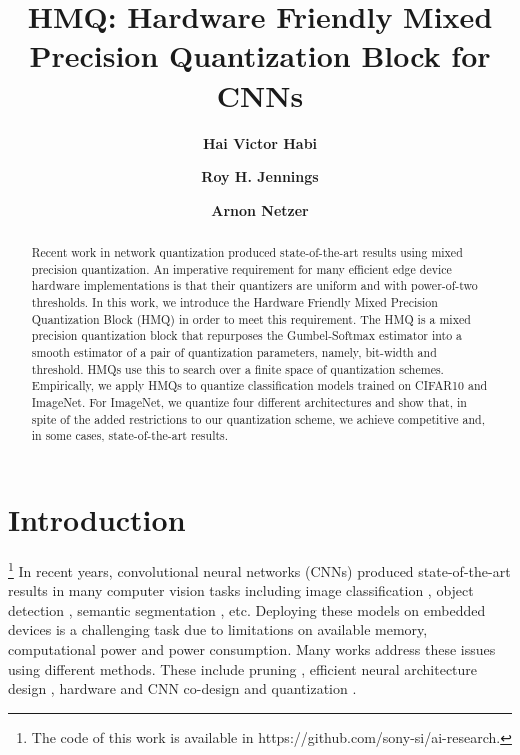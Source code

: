 \documentclass{article}
\title{HMQ: Hardware Friendly Mixed Precision Quantization Block for CNNs}
\author{\bf \small{Hai Victor Habi}}
\author{\bf \small{Roy H. Jennings}}
\author{\bf \small{Arnon Netzer}}
\affil{\large{Sony Semiconductor Israel}\\ \normalsize{\{hai.habi, roy.jennings, arnon.netzer\}@sony.com}}
\begin{document}
\maketitle
\thispagestyle{empty}

\begin{abstract}
Recent work in network quantization produced state-of-the-art results using mixed precision quantization.
An imperative requirement for many efficient edge device hardware implementations is that their quantizers are uniform and with power-of-two thresholds.
In this work, we introduce the Hardware Friendly Mixed Precision Quantization Block (HMQ) in order to meet this requirement.
The HMQ is a mixed precision quantization block that repurposes the Gumbel-Softmax estimator into a smooth estimator of a pair of quantization parameters, namely, bit-width and threshold.
HMQs use this to search over a finite space of quantization schemes.
Empirically, we apply HMQs to quantize classification models trained on CIFAR10 and ImageNet. 
For ImageNet, we quantize four different architectures and show that, in spite of the added restrictions to our quantization scheme, we achieve competitive and, in some cases, state-of-the-art results.
\end{abstract}

\section{Introduction}
{\let\thefootnote\relax\footnote{{The code of this work is available in https://github.com/sony-si/ai-research.}}}
In recent years, convolutional neural networks (CNNs) produced state-of-the-art results in many computer vision tasks including image classification \cite{gholami2018squeezenext,he2016deep,howard2017mobilenets,hu2018squeeze,sandler2018mobilenetv2,tan2019efficientnet}, object detection \cite{liu2016ssd,ren2015faster,tan2019efficientdet}, semantic segmentation \cite{long2015fully,ronneberger2015u}, etc. 
Deploying these models on embedded devices is a challenging task due to limitations on available memory, computational power and power consumption. 
Many works address these issues using different methods.
These include pruning \cite{han2015learning,yu2018nisp,zhang2018systematic}, efficient neural architecture design \cite{gholami2018squeezenext,howard2017mobilenets,jain2019trained,sandler2018mobilenetv2}, hardware and CNN co-design \cite{gholami2018squeezenext,howard2019searching,wu2019fbnet} and quantization \cite{cai2017deep,esser2019learned,han2015deep,jacob2018quantization,jain2019trained,zhang2018lq}. 
\end{document}
